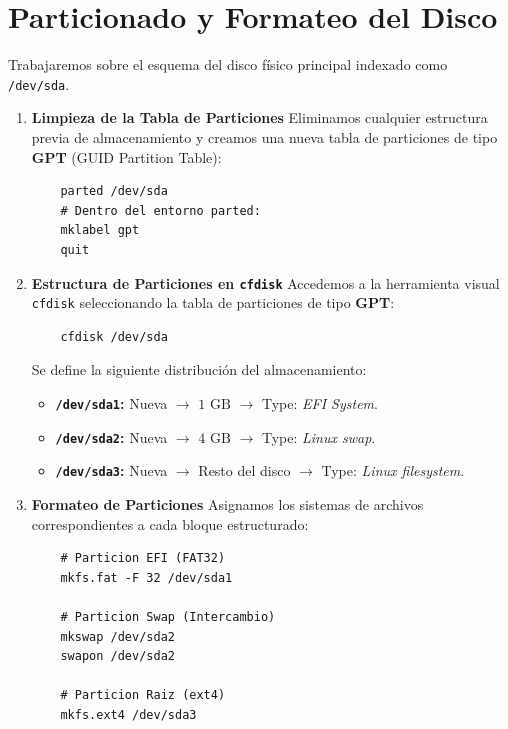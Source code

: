 \newpage

\section{Particionado y Formateo del Disco}
Trabajaremos sobre el esquema del disco físico principal indexado como \texttt{/dev/sda}.

\begin{enumerate}
    \item [$\bullet$] \textbf{Limpieza de la Tabla de Particiones}
    Eliminamos cualquier estructura previa de almacenamiento y creamos una nueva tabla de particiones de tipo \textbf{GPT} (GUID Partition Table):
    \begin{lstlisting}
    parted /dev/sda
    # Dentro del entorno parted:
    mklabel gpt
    quit
    \end{lstlisting}
    \item [$\bullet$] \textbf{Estructura de Particiones en \texttt{cfdisk}}
    Accedemos a la herramienta visual \texttt{cfdisk} seleccionando la tabla de particiones de tipo \textbf{GPT}:
    \begin{lstlisting}
    cfdisk /dev/sda
    \end{lstlisting}

    Se define la siguiente distribución del almacenamiento:
    \begin{itemize}
        \item \textbf{\texttt{/dev/sda1}:} Nueva $\rightarrow$ $1\text{ GB}$ $\rightarrow$ Type: \textit{EFI System}.
        \item \textbf{\texttt{/dev/sda2}:} Nueva $\rightarrow$ $4\text{ GB}$ $\rightarrow$ Type: \textit{Linux swap}.
        \item \textbf{\texttt{/dev/sda3}:} Nueva $\rightarrow$ Resto del disco $\rightarrow$ Type: \textit{Linux filesystem}.
    \end{itemize}

    \item [$\bullet$] \textbf{Formateo de Particiones}
    Asignamos los sistemas de archivos correspondientes a cada bloque estructurado:
    \begin{lstlisting}
    # Particion EFI (FAT32)
    mkfs.fat -F 32 /dev/sda1

    # Particion Swap (Intercambio)
    mkswap /dev/sda2
    swapon /dev/sda2

    # Particion Raiz (ext4)
    mkfs.ext4 /dev/sda3
    \end{lstlisting}
\end{enumerate}


